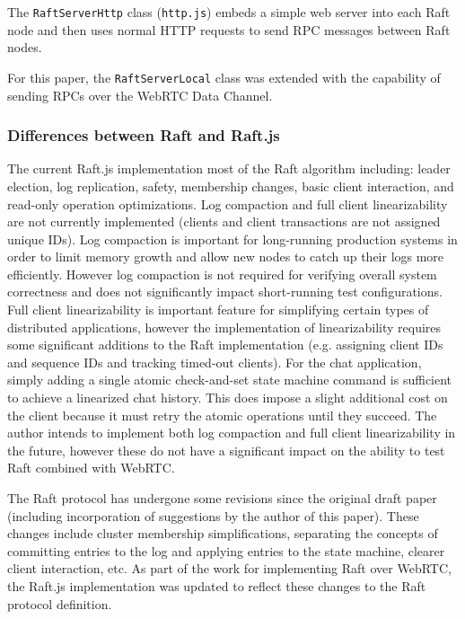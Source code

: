 \documentclass[9pt]{extarticle}
\begin{document}
\begin{multicols}{2}
The \texttt{RaftServerHttp} class (\texttt{http.js}) embeds a simple
web server into each Raft node and then uses normal HTTP requests to
send RPC messages between Raft nodes.

For this paper, the \texttt{RaftServerLocal} class was extended with
the capability of sending RPCs over the WebRTC Data Channel.

\subsubsection{Differences between Raft and Raft.js}

The current Raft.js implementation most of the Raft algorithm
including: leader election, log replication, safety, membership
changes, basic client interaction, and read-only operation
optimizations. %
Log compaction and full client linearizability are not currently
implemented (clients and client transactions are not assigned unique
IDs). Log compaction is important for long-running production systems
in order to limit memory growth and allow new nodes to catch up their
logs more efficiently. However log compaction is not required for
verifying overall system correctness and does not significantly impact
short-running test configurations. Full client linearizability is
important feature for simplifying certain types of distributed
applications, however the implementation of linearizability requires
some significant additions to the Raft implementation (e.g. assigning
client IDs and sequence IDs and tracking timed-out clients). For the
chat application, simply adding a single atomic check-and-set state
machine command is sufficient to achieve a linearized chat history.
This does impose a slight additional cost on the client because it
must retry the atomic operations until they succeed. The author
intends to implement both log compaction and full client
linearizability in the future, however these do not have a significant
impact on the ability to test Raft combined with WebRTC.

The Raft protocol has undergone some revisions since the original
draft paper \cite{raft_paper:ongaro14} (including incorporation of
suggestions by the author of this paper). These changes include
cluster membership simplifications, separating the concepts of
committing entries to the log and applying entries to the state
machine, clearer client interaction, etc. As part of the work for
implementing Raft over WebRTC, the Raft.js implementation was updated
to reflect these changes to the Raft protocol definition.


\end{multicols}
\end{document}
